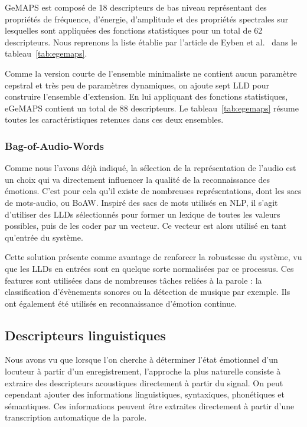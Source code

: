 GeMAPS est composé de 18 descripteurs de bas niveau représentant des propriétés de fréquence, d’énergie, d’amplitude et des propriétés spectrales sur lesquelles sont appliquées des fonctions statistiques pour un total de 62 descripteurs. Nous reprenons la liste établie par l'article de Eyben et al.~\cite{Eyben2016} dans le tableau~\ref{tab:egemaps}.



Comme la version courte de l’ensemble minimaliste ne contient aucun paramètre cepstral et très peu de paramètres dynamiques, on ajoute sept LLD pour construire l’ensemble d’extension. En lui appliquant des fonctions statistiques, eGeMAPS contient un total de 88 descripteurs. Le tableau~\ref{tab:egemaps} résume toutes les caractéristiques retenues dans ces deux ensembles.

\subsubsection{Bag-of-Audio-Words}
Comme nous l'avons déjà indiqué, la sélection de la représentation de l'audio est un choix qui va directement influencer la qualité de la reconnaissance des émotions. C'est pour cela qu'il existe de nombreuses représentations, dont les sacs de mots-audio, ou BoAW. Inspiré des sacs de mots utilisés en NLP, il s'agit d'utiliser des LLDs sélectionnés pour former un lexique de toutes les valeurs possibles, puis de les coder par un vecteur. Ce vecteur est alors utilisé en tant qu'entrée du système.

Cette solution présente comme avantage de renforcer la robustesse du système, vu que les LLDs en entrées sont en quelque sorte normalisées par ce processus. Ces features sont utilisées dans de nombreuses tâches reliées à la parole : la classification d'évènements sonores ou la détection de musique par exemple. Ils ont également été utilisés en reconnaissance d'émotion continue.

\subsection{Descripteurs linguistiques}
Nous avons vu que lorsque l'on cherche à déterminer l'état émotionnel d'un locuteur à partir d'un enregistrement, l'approche la plus naturelle consiste à extraire des descripteurs acoustiques directement à partir du signal. On peut cependant ajouter des informations linguistiques, syntaxiques, phonétiques et sémantiques. Ces informations peuvent être extraites directement à partir d'une transcription automatique de la parole.

